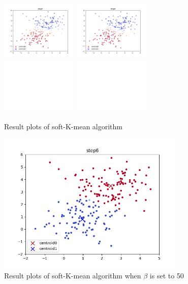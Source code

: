 \documentclass[a4paper]{article}
\begin{document}
\begin{figure}[h!]
    \includegraphics[width=0.327\textwidth]{../ai_assn4_prog/results/2D_soft beta=3/step5.png}
    \includegraphics[width=0.327\textwidth]{../ai_assn4_prog/results/2D_soft beta=3/step6.png}
    \includegraphics[width=0.327\textwidth]{../white.png}
    \includegraphics[width=0.327\textwidth]{../white.png}
    \caption{Result plots of soft-K-mean algorithm}
    \label{fig:result2}
\end{figure}

\begin{figure}[h!]
    \centering
    \includegraphics[width=0.8\textwidth]{../ai_assn4_prog/results/2D_soft/step6.png}
    \caption{Result plots of soft-K-mean algorithm when $\beta$ is set to 50}
    \label{fig:result3}
\end{figure}
\end{document}
